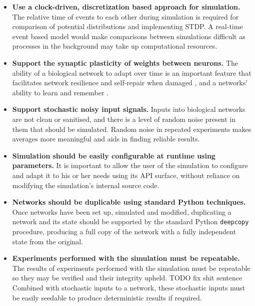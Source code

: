 \begin{itemize}
    \item \textbf{Use a clock-driven, discretization based approach for simulation.} The relative time of
          events to each other during simulation is required for comparison of
          potential distributions and implementing STDP. A real-time event based
          model would make comparisons between simulations difficult as processes in
          the background may take up computational resources.

    \item \textbf{Support the synaptic plasticity of weights between neurons.}
          The ability of a biological network to adapt over time is an important
          feature that facilitates network resilience and self-repair when damaged
          \autocite{trappenberg_fundamentals_2009}, and a networks' ability to learn
          and remember \autocite{eichenbaum_cognitive_2011}.

    \item \textbf{Support stochastic noisy input signals.} Inputs into biological
          networks are not clean or sanitised, and there is a level of random noise
          present in them that should be simulated. Random noise in repeated
          experiments makes averages more meaningful and aids in finding reliable results.

    \item \textbf{Simulation should be easily configurable at runtime using
              parameters.} It is important to allow the user of the simulation to
          configure and adapt it to his or her needs using its API surface, without
          reliance on modifying the simulation's internal source code.

    \item \textbf{Networks should be duplicable using standard Python
              techniques.} Once networks have been set up, simulated and
              modified, duplicating a network and its state should be supported
              by the standard Python \texttt{deepcopy} procedure, producing a
              full copy of the network with a fully independent state from the
              original.

    \item \textbf{Experiments performed with the simulation must be repeatable.}
          The results of experiments performed with the simulation must be
          repeatable so they may be verified and their integrity upheld.
          TODO fix shit sentence Combined with stochastic inputs to a network, these stochastic inputs
          must be easily seedable to produce deterministic results if required.


\end{itemize}
